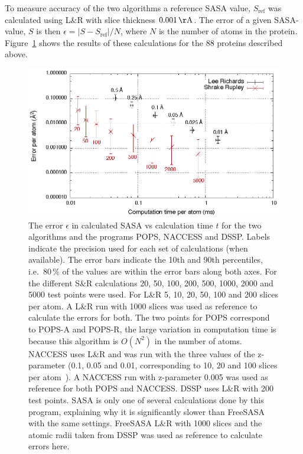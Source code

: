 \documentclass[a4paper,11pt]{article}
\begin{document}
To measure accuracy of the two algorithms a reference SASA value,
$S_\text{ref}$ was calculated using L\&R with slice thickness
$0.001\,\mathrm{\AA}$. The error of a given SASA-value, $S$ is then
$\epsilon = \lvert S - S_\text{ref} \rvert / N$, where $N$ is the
number of atoms in the protein. Figure~\ref{fig:precision} shows the
results of these calculations for the 88 proteins described above.

\begin{figure}
  \begin{center}
    \includegraphics{fig/precision}
    \caption{The error $\epsilon$ in calculated SASA vs calculation
      time $t$ for the two algorithms and the programs POPS, NACCESS
      and DSSP. Labels indicate the precision used for each set of
      calculations (when available). The error bars indicate the 10th
      and 90th percentiles, i.e.\ $80\,\%$ of the values are within
      the error bars along both axes.  For the different S\&R
      calculations 20, 50, 100, 200, 500, 1000, 2000 and 5000 test
      points were used. For L\&R 5, 10, 20, 50, 100 and 200 slices per
      atom. A L\&R run with 1000 slices was used as reference to
      calculate the errors for both. The two points for POPS
      correspond to POPS-A and POPS-R, the large variation in
      computation time is because this algorithm is $O(N^2)$ in the
      number of atoms. NACCESS uses L\&R and was run with the three
      values of the z-parameter (0.1, 0.05 and 0.01, corresponding to
      10, 20 and 100 slices per atom~\cite{NACCESSParam}). A NACCESS
      run with z-parameter 0.005 was used as reference for both POPS
      and NACCESS. DSSP uses L\&R with 200 test points. SASA is only
      one of several calculations done by this program, explaining why
      it is significantly slower than FreeSASA with the same
      settings. FreeSASA L\&R with 1000 slices and the atomic radii
      taken from DSSP was used as reference to calculate errors here.
    \label{fig:precision}}
  \end{center}
\end{figure}
\end{document}
